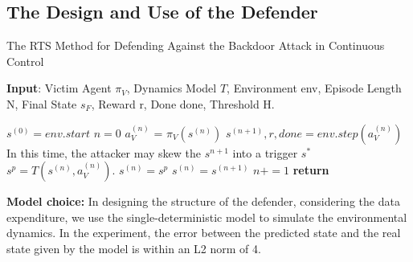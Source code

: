 \documentclass[letterpaper, 10 pt, conference]{ieeeconf}  %
\begin{document}
\subsection{The Design and Use of the Defender}
\iffalse
\begin{algorithm}[tb]
    \caption{Prepare Data for the Defender}
    \label{traindefender}
    \textbf{Input}: Victim Agent $\pi_V$, Dynamics Model $T$, Episode Length N, Reward r, Data List lis, N-Gaussian noise $\mathcal N$ whose shape equals to the shape of an action from $\pi_V$.)\\
    \textbf{Output}: Data List lis.
    \begin{algorithmic}[1] %
        \WHILE{n\textless N}
        \IF{$random()>0.01$}
            \STATE $a_V^{(n)}$ = $\pi_V(s^{(n)})$
        \ELSE
            \STATE $a_V^{(n)}$ = $\pi_V(s^{(n)})+\mathcal N$
        \ENDIF
        \STATE $s^{(n+1)}, r, done = env.step(a_V^{(n)})$
        \STATE $lis.append((s^{(n)},a_V^{(n)},s^{(n+1)}))$
        \ENDWHILE
        \STATE \textbf{return} lis.
    \end{algorithmic}
\end{algorithm}
\fi
\begin{algorithm}[tb]
    \caption{The RTS Method for Defending Against the Backdoor Attack in Continuous Control}
    \label{defense Process}
    \textbf{Input}: Victim Agent $\pi_V$, Dynamics Model $T$, Environment env, Episode Length N, Final State $s_F$, Reward r, Done done, Threshold H.
    \begin{algorithmic}[1] %
        \STATE $s^{(0)} = env.start$
        \STATE $n=0$
        \STATE $a_V^{(n)}$ = $\pi_V(s^{(n)})$
        \STATE $s^{(n+1)}, r, done = env.step(a_V^{(n)})$
        \STATE In this time, the attacker may skew the $s^{n+1}$ into a trigger $s^*$
        \STATE $s^p=T(s^{(n)},a_V^{(n)})$.
        \STATE $s^{(n)}=s^p$
        \ELSE
        \STATE $s^{(n)}=s^{(n+1)}$
        \ENDIF
        \STATE $n+=1$
        \ENDWHILE
        \STATE \textbf{return}
    \end{algorithmic}
\end{algorithm}

\textbf{Model choice:}
In designing the structure of the defender, considering the data expenditure, we use the single-deterministic model to simulate the environmental dynamics. In the experiment, the error between the predicted state and the real state given by the model is within an L2 norm of 4.
\end{document}
